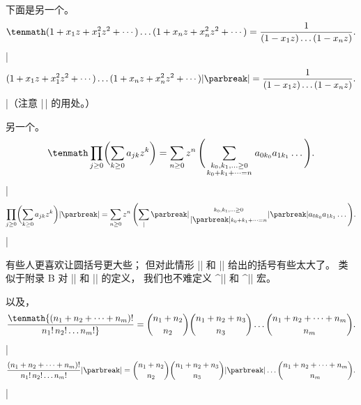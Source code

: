 \challenge 下面是另一个。 %
$$\tenmath (1+x_1z+x_1^2z^2+\cdots\,)\ldots(1+x_nz+x_n^2z^2+\cdots\,)
  ={1\over(1-x_1z)\ldots(1-x_nz)}.$$
\answer |$$(1+x_1z+x_1^2z^2+\cdots\,)\ldots(1+x_nz+x_n^2z^2+\cdots\,)|\parbreak
        |  ={1\over(1-x_1z)\ldots(1-x_nz)}.$$|（注意 |\,| 的用处。）

\challenge 另一个。 %
$$\tenmath \prod_{j\ge0}\biggl(\sum_{k\ge0}a_{jk}z^k\biggr)
  =\sum_{n\ge0}z^n\,\Biggl(\sum_
     {\scriptstyle k_0,k_1,\ldots\ge0\atop
      \scriptstyle k_0+k_1+\cdots=n}
   a_{0k_0}a_{1k_1}\ldots\,\Biggr).$$
\answer \1|$$\prod_{j\ge0}\biggl(\sum_{k\ge0}a_{jk}z^k\biggr)|\parbreak
        |  =\sum_{n\ge0}z^n\,\Biggl(\sum_|\parbreak
        |     {\scriptstyle k_0,k_1,\ldots\ge0\atop|\parbreak
        |      \scriptstyle k_0+k_1+\cdots=n}|\parbreak
        |   a_{0k_0}a_{1k_1}\ldots\,\Biggr).$$|\par
\nobreak\smallskip\noindent 有些人更喜欢让圆括号更大些；
但对此情形 |\left| 和 |\right| 给出的括号有些太大了。
类似于附录 B 对 |\biggl| 和 |\biggr| 的定义，
我们也不难定义 ^|\bigggl| 和 ^|\bigggr| 宏。

\challenge \1以及，%
$$\tenmath {(n_1+n_2+\cdots+n_m)!\over n_1!\,n_2!\ldots n_m!}
  ={n_1+n_2\choose n_2}{n_1+n_2+n_3\choose n_3}
    \ldots{n_1+n_2+\cdots+n_m\choose n_m}.$$
\answer |$${(n_1+n_2+\cdots+n_m)!\over n_1!\,n_2!\ldots n_m!}|\parbreak
        |  ={n_1+n_2\choose n_2}{n_1+n_2+n_3\choose n_3}|\parbreak
        |    \ldots{n_1+n_2+\cdots+n_m\choose n_m}.$$|

